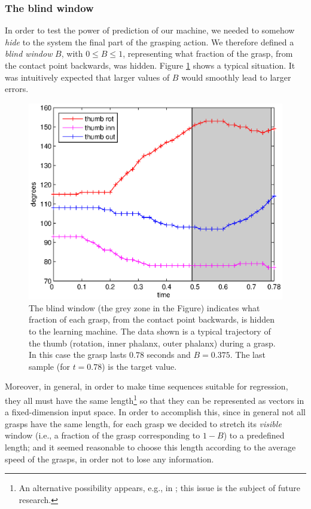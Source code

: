 \subsubsection*{The blind window}

In order to test the power of prediction of our machine, we needed to
somehow \emph{hide} to the system the final part of the grasping
action. We therefore defined a \emph{blind window} $B$, with $0
\leq B \leq 1$, representing what fraction of the grasp, from the
contact point backwards, was hidden. Figure \ref{fig:B_example} shows a
typical situation. It was intuitively expected that larger values of
$B$ would smoothly lead to larger errors.

\begin{figure}[htbp]
  \begin{center}
    \includegraphics[width=0.5\linewidth]{B_example.eps}
    \caption{The blind window (the grey zone in the Figure) indicates
    what fraction of each grasp, from the contact point backwards, is
    hidden to the learning machine.
    The data shown is a typical trajectory of the
    thumb (rotation, inner phalanx, outer phalanx) during a grasp. In
    this case the grasp lasts $0.78$ seconds and $B=0.375$. The last
    sample (for $t=0.78$) is the target value.}
    \label{fig:B_example}
  \end{center}
\end{figure}

Moreover, in general, in order to make time sequences suitable for
regression, they all must have the same length\footnote{An alternative
possibility appears, e.g., in \cite{shimodaira02dynamic}; this issue
is the subject of future research.} so that they can be represented as
vectors in a fixed-dimension input space. In order to accomplish this,
since in general not all grasps have the same length, for each grasp
we decided to stretch its \emph{visible} window (i.e., a fraction of
the grasp corresponding to $1-B$) to a predefined length; and it
seemed reasonable to choose this length according to the average speed
of the grasps, in order not to lose any information.

